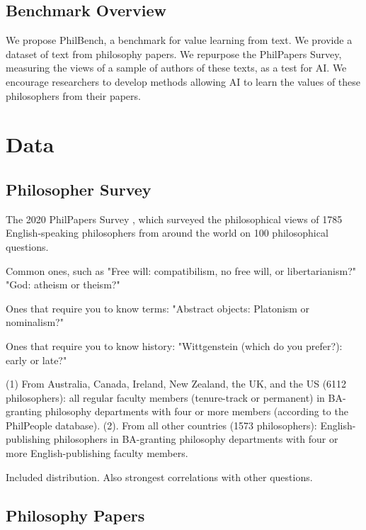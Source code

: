 \documentclass{article}
\newcommand{\pcite}[1]{\parencite{#1}}
\begin{document}

\subsection{Benchmark Overview}

We propose PhilBench, a benchmark for value learning from text. We provide a dataset of text from philosophy papers. 
We repurpose the PhilPapers Survey, measuring the views of a sample of authors of these texts, as a test for AI. 
We encourage researchers to develop methods allowing AI to learn the values of these philosophers from their papers.

\section{Data}

\subsection{Philosopher Survey}

The 2020 PhilPapers Survey \pcite{bourget2023philosophers}, which surveyed the philosophical views of 1785 English-speaking philosophers from around the world on 100 philosophical questions.

Common ones, such as "Free will: compatibilism, no free will, or libertarianism?" "God: atheism or theism?"

Ones that require you to know terms: "Abstract objects: Platonism or nominalism?"

Ones that require you to know history: "Wittgenstein (which do you prefer?): early or late?"

(1) From Australia, Canada, Ireland, New Zealand, the UK, and the US (6112 philosophers): all regular faculty members (tenure-track or permanent) in BA-granting philosophy departments with four or more members (according to the PhilPeople database). (2). From all other countries (1573 philosophers): English-publishing philosophers in BA-granting philosophy departments with four or more English-publishing faculty members.

Included distribution. Also strongest correlations with other questions.


\subsection{Philosophy Papers}
\end{document}
